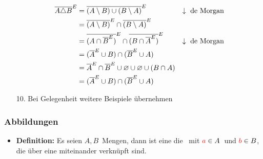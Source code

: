 \begin{itemize}
                        \begin{align*}
                            \overline{A \triangle B}^E & = \overline{(A \setminus B) \cup (B \setminus A)}^E & \downarrow \text{~de Morgan}\\
                            & = \overline{(A \setminus B)}^E \cap \overline{(B \setminus A)}^E \\
                            & = \overline{(A \cap \overline{B}^E)}^E \cap \overline{(B \cap \overline{A}^E)}^E & \downarrow \text{~de Morgan} \\
                            & = (\overline{A}^E \cup B) \cap (\overline{B}^E \cup A) \\
                            & = \overline{A}^E \cap \overline{B}^E \cup \varnothing \cup \varnothing \cup (B \cap A) \\
                            & = (\overline{A}^E \cup B) \cap (\overline{B}^E \cup A) \\
                        \end{align*}
                    \item[10.] Bei Gelegenheit weitere Beispiele übernehmen
                \end{itemize}
            \subsubsection{Abbildungen}
                \begin{itemize}
                    \item \textbf{Definition:} Es seien $A, B$~Mengen, dann ist eine  die ~mit $\textcolor{red}{a} \in A$~und $\textcolor{red}{b} \in B$, die über eine  miteinander verknüpft sind.
                \end{itemize}
                      
